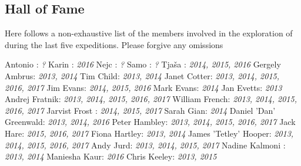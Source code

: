 \newpage \begin{fullwidth} \chapter{Hall of Fame} 

Here follows a non-exhaustive list of the members involved in the exploration of  during the last five expeditions. Please forgive any omissions 

\begin{multicols}{2} 
Antonio : \textsl{? }
\newline
Karin : \textsl{2016 }
\newline
Nejc : \textsl{? }
\newline
Samo : \textsl{? }
\newline
Tja\v{s}a : \textsl{2014, 2015, 2016 }
\newline
Gergely Ambrus: \textsl{2013, 2014 }
\newline
Tim Child: \textsl{2013, 2014 }
\newline
Janet Cotter: \textsl{2013, 2014, 2015, 2016, 2017 }
\newline
Jim Evans: \textsl{2014, 2015, 2016 }
\newline
Mark Evans: \textsl{2014 }
\newline
Jan Evetts: \textsl{2013 }
\newline
Andrej Fratnik: \textsl{2013, 2014, 2015, 2016, 2017 }
\newline
William French: \textsl{2013, 2014, 2015, 2016, 2017 }
\newline
Jarvist Frost : \textsl{2014, 2015, 2017 }
\newline
Sarah Gian: \textsl{2014 }
\newline
Daniel 'Dan' Greenwald: \textsl{2013, 2014, 2016 }
\newline
Peter Hambley: \textsl{2013, 2014, 2015, 2016, 2017 }
\newline
Jack Hare: \textsl{2015, 2016, 2017 }
\newline
Fiona Hartley: \textsl{2013, 2014 }
\newline
James 'Tetley' Hooper: \textsl{2013, 2014, 2015, 2016, 2017 }
\newline
Andy Jurd: \textsl{2013, 2014, 2015, 2017 }
\newline
Nadine Kalmoni : \textsl{2013, 2014 }
\newline
Maniesha Kaur: \textsl{2016 }
\newline
Chris Keeley: \textsl{2013, 2015 }
\newline

\end{multicols}
\end{fullwidth}
